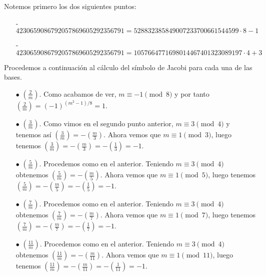 \documentclass[fleqn]{article}
\begin{document}
    Notemos primero los dos siguientes puntos:
    \begin{enumerate}
        \item[-] $ 4230659086792057869605292356791 = 528832385849007233700661544599\cdot 8 - 1 $
        \item[-] $ 4230659086792057869605292356791 = 1057664771698014467401323089197\cdot 4 + 3$
    \end{enumerate}
    Procedemos a continuación al cálculo del símbolo de Jacobi para cada una de las bases.\\ 
    \begin{enumerate}
        \item[$\bullet$] $\left(\frac{2}{m}\right)$. Como acabamos de ver, $m \equiv -1 \pmod{8}$ y por tanto 
                        $\left(\frac{2}{m}\right) = (-1)^{(m^2 - 1)/8} = 1$.
        \item[$\bullet$] $\left(\frac{3}{m}\right)$. Como vimos en el segundo punto anterior, $m \equiv 3 \pmod{4}$ y tenemos así
                        $\left(\frac{3}{m}\right) = -\left(\frac{m}{3}\right)$. Ahora vemos que $m \equiv 1 \pmod{3}$, luego tenemos 
                        $\left(\frac{3}{m}\right) = -\left(\frac{m}{3}\right) = -\left(\frac{1}{3}\right) = -1$.
        \item[$\bullet$] $\left(\frac{5}{m}\right)$. Procedemos como en el anterior. Teniendo $m \equiv 3 \pmod{4}$ obtenemos
                        $\left(\frac{5}{m}\right) = -\left(\frac{m}{5}\right)$. Ahora vemos que $m \equiv 1 \pmod{5}$, luego tenemos 
                        $\left(\frac{5}{m}\right) = -\left(\frac{m}{5}\right) = -\left(\frac{1}{5}\right) = -1$.
        \item[$\bullet$] $\left(\frac{7}{m}\right)$. Procedemos como en el anterior. Teniendo $m \equiv 3 \pmod{4}$ obtenemos
                        $\left(\frac{7}{m}\right) = -\left(\frac{m}{7}\right)$. Ahora vemos que $m \equiv 1 \pmod{7}$, luego tenemos 
                        $\left(\frac{7}{m}\right) = -\left(\frac{m}{7}\right) = -\left(\frac{1}{7}\right) = -1$.
        \item[$\bullet$] $\left(\frac{11}{m}\right)$. Procedemos como en el anterior. Teniendo $m \equiv 3 \pmod{4}$ obtenemos
                        $\left(\frac{11}{m}\right) = -\left(\frac{m}{11}\right)$. Ahora vemos que $m \equiv 1 \pmod{11}$, luego tenemos 
                        $\left(\frac{11}{m}\right) = -\left(\frac{m}{11}\right) = -\left(\frac{1}{11}\right) = -1$.
    \end{enumerate}
\end{document}
